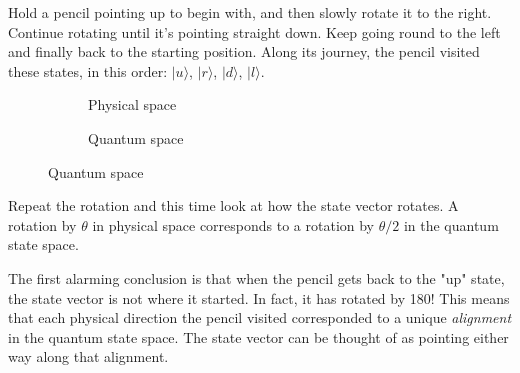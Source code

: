 Hold a pencil pointing up to begin with, and then slowly rotate it to the right. Continue rotating until it's pointing straight down. Keep going round to the left and finally back to the starting position. Along its journey, the pencil visited these states, in this order: $|u\rangle$, $|r\rangle$, $|d\rangle$, $|l\rangle$.

\begin{figure}[h]    
  \caption{Rotating the pencil}
  \begin{subfigure}{0.5\textwidth}
      \centering
  \caption{Physical space} \label{fig:pencil-physical}
  \end{subfigure}
  \begin{subfigure}{0.5\textwidth}
      \centering
      \caption{Quantum space} \label{fig:pencil-quantum}
  \end{subfigure}
\end{figure}

Repeat the rotation and this time look at how the state vector rotates. A rotation by $\theta$ in physical space corresponds to a rotation by $\theta/2$ in the quantum state space.

The first alarming conclusion is that when the pencil gets back to the "up" state, the state vector is not where it started. In fact, it has rotated by 180\textdegree! This means that each physical direction the pencil visited corresponded to a unique \textit{alignment} in the quantum state space. The state vector can be thought of as pointing either way along that alignment.

